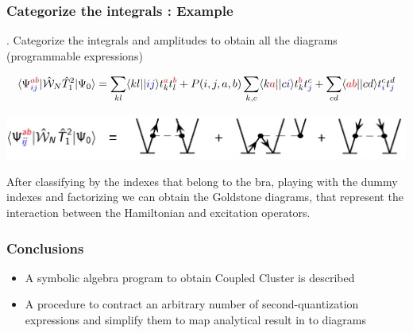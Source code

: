 \documentclass{beamer}
\begin{document}
\begin{frame}
\frametitle{Categorize the integrals : Example}
\begin{footnotesize}
\begin{algorithmic}

. Categorize the integrals and amplitudes to obtain all the diagrams (programmable expressions)








\[
\langle \Psi^{\textcolor{red}{ab}}_{\textcolor{blue}{ij}} |  \hat{\mathcal{W}}_{N} \hat{T}_{1}^{2}   | \Psi_{0} \rangle = \sum_{kl} \langle kl||\textcolor{blue}{ij} \rangle  t_{k}^{\textcolor{red}{a}}t_{l}^{\textcolor{red}{b}} +P(i,j,a,b)\sum_{k,c} \langle k \textcolor{red}{a}||c\textcolor{blue}{i} \rangle  
t_{k}^{ \textcolor{red}{b} }t_{ \textcolor{blue}{j}}^{c}+\sum_{cd} \langle  \textcolor{red}{ab}||cd \rangle  
t_{\textcolor{blue}{i}}^{ c }t_{ \textcolor{blue}{j}}^{d}
\]


\includegraphics[scale=.22]{sumdiag}


After classifying by the indexes that belong to the bra, playing with the dummy indexes and factorizing we can obtain the Goldstone diagrams, that represent the interaction between the Hamiltonian and excitation operators.

\end{algorithmic}
\end{footnotesize}


\end{frame}


\begin{frame}
\frametitle{Conclusions}
\begin{itemize}
\item A symbolic algebra program to obtain Coupled Cluster is described 
\item A procedure to contract an arbitrary number of second-quantization expressions and simplify them to map analytical result in to diagrams
\end{itemize}

\end{frame}
\end{document}
